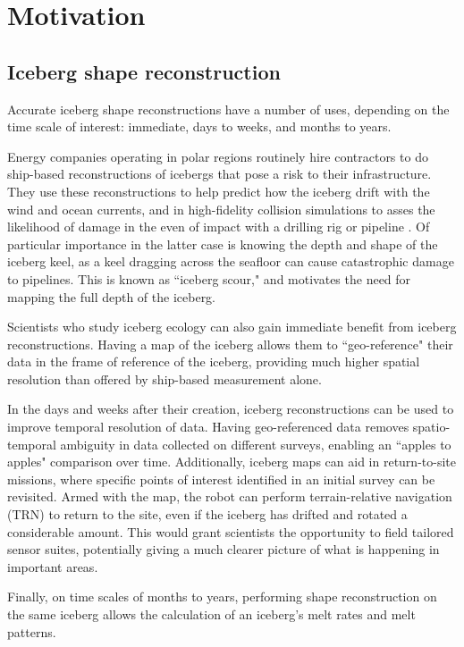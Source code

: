 \section{Motivation}

\subsection{Iceberg shape reconstruction}

Accurate iceberg shape reconstructions have a number of uses, depending on the time scale of interest: immediate, days to weeks, and months to years. 

Energy companies operating in polar regions routinely hire contractors to do ship-based reconstructions of icebergs that pose a risk to their infrastructure. They use these reconstructions to help predict how the iceberg drift with the wind and ocean currents, and in high-fidelity collision simulations to asses the likelihood of damage in the even of impact with a drilling rig or pipeline \cite{ralph2008iceberg} \cite{fuglem1996iceberg}. Of particular importance in the latter case is knowing the depth and shape of the iceberg keel, as a keel dragging across the seafloor can cause catastrophic damage to pipelines. This is known as ``iceberg scour," and motivates the need for mapping the full depth of the iceberg.

Scientists who study iceberg ecology can also gain immediate benefit from iceberg reconstructions. Having a map of the iceberg allows them to ``geo-reference" their data in the frame of reference of the iceberg, providing much higher spatial resolution than offered by ship-based measurement alone.

In the days and weeks after their creation, iceberg reconstructions can be used to improve temporal resolution of data. Having geo-referenced data removes spatio-temporal ambiguity in data collected on different surveys, enabling an ``apples to apples" comparison over time. Additionally, iceberg maps can aid in return-to-site missions, where specific points of interest identified in an initial survey can be revisited. Armed with the map, the robot can perform terrain-relative navigation (TRN) to return to the site, even if the iceberg has drifted and rotated a considerable amount. This would grant scientists the opportunity to field tailored sensor suites, potentially giving a much clearer picture of what is happening in important areas.

Finally, on time scales of months to years, performing shape reconstruction on the same iceberg allows the calculation of an iceberg's melt rates and melt patterns.

